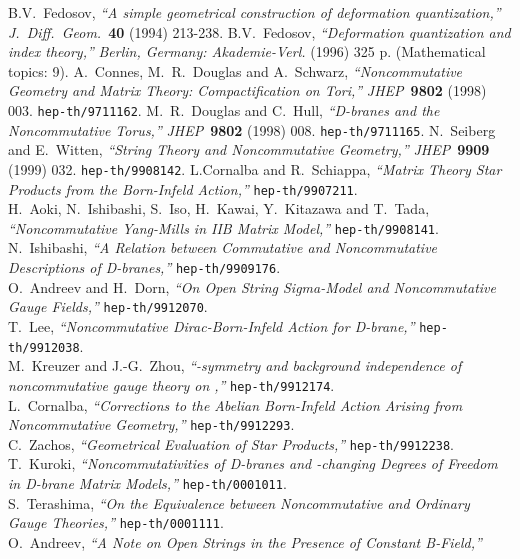 \documentclass[10pt,a4paper]{article}
\begin{document}
\begin{thebibliography}{99}
B.V.~Fedosov,
{\it ``A simple geometrical construction of deformation quantization,''}
{\sl J.~Diff.~Geom.}~{\bf 40} (1994) 213-238.
B.V.~Fedosov,
{\it ``Deformation quantization and index theory,''}
{\sl  Berlin, Germany: Akademie-Verl.} (1996) 325 p. (Mathematical topics: 9).
A.~Connes, M.~R.~Douglas and A.~Schwarz,
{\it ``Noncommutative Geometry and Matrix Theory: Compactification on Tori,''}
{\sl JHEP}~{\bf 9802} (1998) 003. {\tt hep-th/9711162}.
M.~R.~Douglas and C.~Hull,
{\it ``D-branes and the Noncommutative Torus,''}
{\sl JHEP}~{\bf 9802} (1998) 008.
{\tt hep-th/9711165}.
N.~Seiberg and E.~Witten,
{\it ``String Theory and Noncommutative Geometry,''}
{\sl JHEP}~{\bf 9909} (1999) 032. {\tt hep-th/9908142}.
L.Cornalba and R.~Schiappa,
{\it ``Matrix Theory Star Products from the Born-Infeld Action,''}
{\tt hep-th/9907211}.\\
H.~Aoki, N.~Ishibashi, S.~Iso, H.~Kawai, Y.~Kitazawa and T.~Tada,
{\it ``Noncommutative Yang-Mills in IIB Matrix Model,''}
{\tt hep-th/9908141}.\\
N.~Ishibashi,
{\it ``A Relation between Commutative and Noncommutative Descriptions of D-branes,''}
{\tt hep-th/9909176}.\\
O.~Andreev and H.~Dorn,
{\it ``On Open String Sigma-Model and Noncommutative Gauge Fields,''}
{\tt hep-th/9912070}.\\
T.~Lee,
{\it ``Noncommutative Dirac-Born-Infeld Action for D-brane,''}
{\tt hep-th/9912038}.\\
M.~Kreuzer and J.-G.~Zhou,
{\it ``\myHighlight{$\Lambda$}\coordHE{}-symmetry and background independence of noncommutative gauge theory on \coordHE{},''}
{\tt hep-th/9912174}.\\
L.~Cornalba,
{\it ``Corrections to the Abelian Born-Infeld Action Arising from Noncommutative Geometry,''}
{\tt hep-th/9912293}.\\
C.~Zachos,
{\it ``Geometrical Evaluation of Star Products,''}
{\tt hep-th/9912238}.\\
T.~Kuroki,
{\it ``Noncommutativities of D-branes and \myHighlight{$\theta$}\coordHE{}-changing Degrees of Freedom in D-brane Matrix Models,''}
{\tt hep-th/0001011}.\\
S.~Terashima,
{\it ``On the Equivalence between Noncommutative and Ordinary Gauge Theories,''}
{\tt hep-th/0001111}.\\
O.~Andreev,
{\it ``A Note on Open Strings in the Presence of Constant B-Field,''}

\end{thebibliography}
\end{document}
